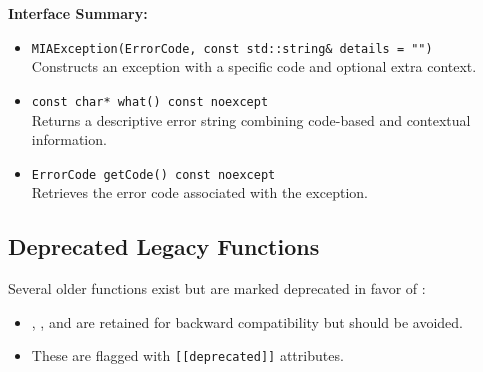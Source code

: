 \textbf{Interface Summary:}
\begin{itemize}\itemsep0em
	\item \texttt{MIAException(ErrorCode, const std::string\& details = "")} \\
	Constructs an exception with a specific code and optional extra context.
	\item \texttt{const char* what() const noexcept} \\
	Returns a descriptive error string combining code-based and contextual information.
	\item \texttt{ErrorCode getCode() const noexcept} \\
	Retrieves the error code associated with the exception.
\end{itemize}

\subsection{Deprecated Legacy Functions}
Several older functions exist but are marked deprecated in favor of :
\begin{itemize}\itemsep0em
	\item {}, , and  are retained for backward compatibility but should be avoided.
	\item These are flagged with \texttt{[[deprecated]]} attributes.
\end{itemize}


